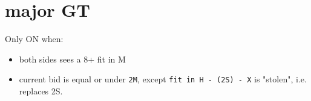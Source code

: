 \section{major GT}

Only ON when:
\begin{itemize}
    \setlength\itemsep{0pt}
    \item both sides sees a 8+ fit in M
    \item current bid is equal or under \texttt{2M}, except \texttt{fit in H - (2S) - X} is "stolen", i.e. replaces 2S.
\end{itemize}



